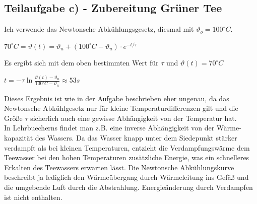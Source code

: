 \documentclass{article}
\begin{document}
\subsection*{Teilaufgabe c) - Zubereitung Grüner Tee}
Ich verwende das Newtonsche Abkühlungsgesetz, diesmal mit $\vartheta_o=100^\circ C$.
\begin{center}
	$70^\circ C = \vartheta (t) = \vartheta_u + (100^\circ C - \vartheta_u ) \cdot e^{-t/\tau}$ 
\end{center}
Es ergibt sich mit dem oben bestimmten Wert für $\tau$ und $\vartheta (t) = 70^\circ C$
\begin{center}
	$t=-\tau \ln{\frac{\vartheta (t) - \vartheta_u}{ 100^\circ C - \vartheta_u}} \approx 53 s$
\end{center}
Dieses Ergebnis ist wie in der Aufgabe beschrieben eher ungenau, da das Newtonsche Abkühlgesetz nur für kleine Temperaturdifferenzen gilt und 
die Größe $\tau$ sicherlich auch eine gewisse Abhängigkeit von der Temperatur hat.\\In Lehrbuecherns findet man z.B. eine inverse Abh\"angigkeit von der W\"arme-kapazit\"at des Wassers.
Da das Wasser knapp unter dem Siedepunkt stärker verdampft als bei kleinen Temperaturen, entzieht die Verdampfungswärme dem Teewasser bei den hohen Temperaturen zusätzliche Energie, 
was ein schnelleres Erkalten des Teewassers erwarten lässt. 
Die Newtonsche Abkühlungskurve beschreibt ja lediglich den Wärmeübergang durch Wärmeleitung ins Gefäß und die umgebende Luft durch die Abstrahlung. 
Energieänderung durch Verdampfen ist nicht enthalten.      
\end{document}
